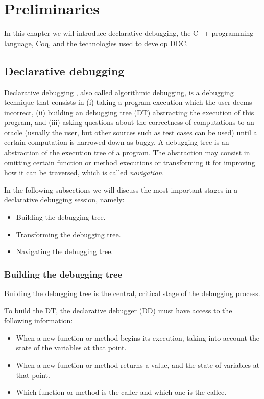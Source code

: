 \chapter{Preliminaries}
\label{cap:preliminaries}

In this chapter we will introduce declarative debugging, the C++ programming language, Coq, and the technologies used to develop DDC.

\section{Declarative debugging}
Declarative debugging \cite{shapiro1982algorithmic}, also called algorithmic debugging, is a debugging technique that consists in (i) taking a program execution which the user deems incorrect, (ii) building an debugging tree (DT) abstracting the execution of this program, and (iii) asking questions about the correctness of computations to an oracle (usually the user, but other sources such as test cases can be used) until a certain computation is narrowed down as buggy.
A debugging tree is an abstraction of the execution tree of a program. The abstraction may consist in omitting certain function or method executions or transforming it for improving how it can be traversed, which is called \emph{navigation}. 

In the following subsections we will discuss the most important stages in a declarative debugging session, namely:
\begin{itemize}
    \item Building the debugging tree.
    \item Transforming the debugging tree.
    \item Navigating the debugging tree.
\end{itemize}

\subsection{Building the debugging tree}

Building the debugging tree is the central, critical stage of the debugging process.

To build the DT, the declarative debugger (DD) must have access to the following information:
\begin{itemize}
    \item When a new function or method begins its execution, taking into account the state of the variables at that point.
    \item When a new function or method returns a value, and the state of variables at that point.
    \item Which function or method is the caller and which one is the callee.
\end{itemize}

